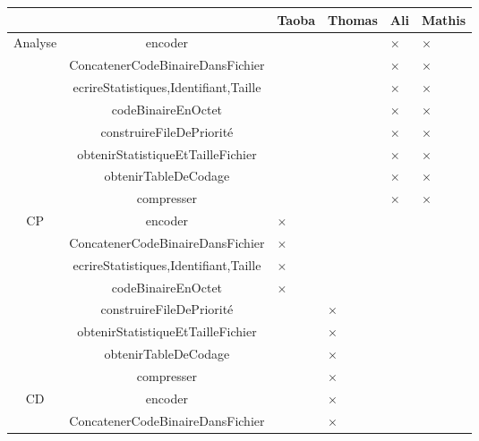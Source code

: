  
 \begin{table}[ht]
    \centering
    \begin{tabular}{|c|c|>{\centering\arraybackslash}p{1.5cm}|>{\centering\arraybackslash}p{1.5cm}|>{\centering\arraybackslash}p{1.5cm}|>{\centering\arraybackslash}p{1.5cm}|}
        \cline{3-6}
        \multicolumn{2}{c|}{} & Taoba & Thomas & Ali & Mathis \\
        \hline
        \multirow{8}{*}{Analyse}
        & encoder & & & $\times$ & $\times$ \\
        \cline{2-6}
        & ConcatenerCodeBinaireDansFichier & & & $\times$ & $\times$ \\
        \cline{2-6}
        & ecrireStatistiques,Identifiant,Taille &  & & $\times$ & $\times$ \\ 
        \cline{2-6}
        & codeBinaireEnOctet & & & $\times$ & $\times$ \\
        \cline{2-6}
        & construireFileDePriorité & & & $\times$ & $\times$ \\
        \cline{2-6}
        & obtenirStatistiqueEtTailleFichier & & & $\times$ & $\times$ \\
        \cline{2-6}
        & obtenirTableDeCodage & & & $\times$ & $\times$ \\
        \cline{2-6}
        & compresser & & & $\times$ & $\times$ \\
        \hline
        \multirow{8}{*}{CP}
        & encoder & $\times$ & & & \\
        \cline{2-6}
        & ConcatenerCodeBinaireDansFichier & $\times$ & & & \\
        \cline{2-6}
        & ecrireStatistiques,Identifiant,Taille & $\times$ & & & \\ 
        \cline{2-6}
        & codeBinaireEnOctet & $\times$ & & & \\
        \cline{2-6}
        & construireFileDePriorité & & $\times$ & &  \\
        \cline{2-6}
        & obtenirStatistiqueEtTailleFichier & & $\times$ & &  \\
        \cline{2-6}
        & obtenirTableDeCodage & & $\times$ & &  \\
        \cline{2-6}
        & compresser & & $\times$ & & \\
        \hline
        \multirow{8}{*}{CD}
        & encoder & & $\times$ & & \\
        \cline{2-6}
        & ConcatenerCodeBinaireDansFichier & & $\times$ & & \\

\end{tabular}
\end{table}
